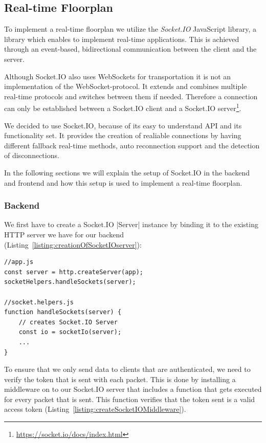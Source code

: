 \subsection{Real-time Floorplan}
\label{Real-time Floorplan}

To implement a real-time floorplan we utilize the \emph{Socket.IO} JavaScript library, a library which enables to implement real-time applications. This is achieved through an event-based, bidirectional communication between the client and the server. 

Although Socket.IO also uses WebSockets for transportation it is not an implementation of the WebSocket-protocol. It extends and combines multiple real-time protocols and switches between them if needed. Therefore a connection can only be established between a Socket.IO client and a Socket.IO server\footnote{\url{https://socket.io/docs/index.html}}.

We decided to use Socket.IO, because of its easy to understand API and its functionality set. It provides the creation of realiable connections by having different fallback real-time methods, auto reconnection support and the detection of disconnections.

In the following sections we will explain the setup of Socket.IO in the backend and frontend and how this setup is used to implement a real-time floorplan.

\subsubsection{Backend}
\label{Backend}

We first have to create a Socket.IO |Server|\cite{socketio:server} instance by binding it to the existing HTTP server we have for our backend (Listing~\ref{listing:creationOfSocketIOserver}):

\begin{lstlisting}[label={listing:creationOfSocketIOserver},caption={Creation of Socket.IO server}]
//app.js
const server = http.createServer(app);
socketHelpers.handleSockets(server);

//socket.helpers.js
function handleSockets(server) {
	// creates Socket.IO Server
    const io = socketIo(server);
    ...
}
\end{lstlisting}

To ensure that we only send data to clients that are authenticated, we need to verify the token that is sent with each packet. This is done by installing a middleware on to our Socket.IO server that includes a function that gets executed for every packet that is sent. This function verifies that the token sent is a valid access token (Listing~\ref{listing:createSocketIOMiddleware}).

